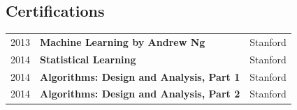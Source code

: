 \documentclass[a4paper, oneside, final]{scrartcl}
\begin{document}
\begin{center}

\section{\textbf{Certifications}}

\begin{tabularx}{0.99\linewidth}{p{2cm} p{8.8cm} p{2cm}}
2013 & \textbf{Machine Learning by Andrew Ng} & Stanford \\
2014 & \textbf{Statistical Learning} & Stanford  \\
2014 & \textbf{Algorithms: Design and Analysis, Part 1} & Stanford  \\
2014 & \textbf{Algorithms: Design and Analysis, Part 2} & Stanford  \\
\end{tabularx}


\end{center}
\end{document}
